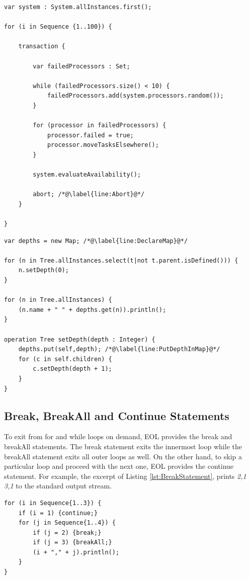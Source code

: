 \begin{lstlisting}[float=h, caption=Example of a for statement, label=lst:TransactionStatement, language=EOL]
var system : System.allInstances.first();

for (i in Sequence {1..100}) {

	transaction {
		
		var failedProcessors : Set; 
		
		while (failedProcessors.size() < 10) {
			failedProcessors.add(system.processors.random());
		}
		
		for (processor in failedProcessors) {
			processor.failed = true;
			processor.moveTasksElsewhere();
		}
		
		system.evaluateAvailability();
		
		abort; /*@\label{line:Abort}@*/
	}
	
}
\end{lstlisting}

\begin{lstlisting}[float=h, caption=Calculating and printing the depth of each Tree, label=lst:NoExtendedProperties, language=EOL]
var depths = new Map; /*@\label{line:DeclareMap}@*/

for (n in Tree.allInstances.select(t|not t.parent.isDefined())) {
	n.setDepth(0);
}

for (n in Tree.allInstances) {
	(n.name + " " + depths.get(n)).println();
}

operation Tree setDepth(depth : Integer) {
	depths.put(self,depth); /*@\label{line:PutDepthInMap}@*/
	for (c in self.children) {
		c.setDepth(depth + 1);
	}
}
\end{lstlisting}

\subsection{Break, BreakAll and Continue Statements}

To exit from for and while loops on demand, EOL provides the break and breakAll statements. The break statement exits the innermost loop while the breakAll statement exits all outer loops as well. On the other hand, to skip a particular loop and proceed with the next one, EOL provides the continue statement. For example, the excerpt of Listing \ref{lst:BreakStatement}, prints \textit{2,1 3,1} to the standard output stream.

\begin{lstlisting}[float=h, caption=Example of the break\, breakAll and continue statements, label=lst:BreakStatement, language=EOL]
for (i in Sequence{1..3}) {
	if (i = 1) {continue;}
	for (j in Sequence{1..4}) {
		if (j = 2) {break;}
		if (j = 3) {breakAll;}
		(i + "," + j).println();
	}
}
\end{lstlisting}

